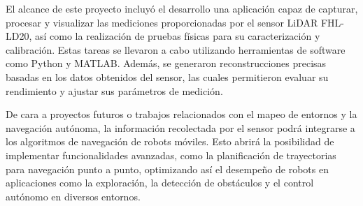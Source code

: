 El alcance de este proyecto incluyó el desarrollo una aplicación capaz de capturar, procesar y visualizar las mediciones proporcionadas por el sensor LiDAR FHL-LD20, así como la realización de pruebas físicas para su caracterización y calibración. Estas tareas se llevaron a cabo utilizando herramientas de software como Python y MATLAB. Además, se generaron reconstrucciones precisas basadas en los datos obtenidos del sensor, las cuales permitieron evaluar su rendimiento y ajustar sus parámetros de medición.
	
De cara a proyectos futuros o trabajos relacionados con el mapeo de entornos y la navegación autónoma, la información recolectada por el sensor podrá integrarse a los algoritmos de navegación de robots móviles. Esto abrirá la posibilidad de implementar funcionalidades avanzadas, como la planificación de trayectorias para navegación punto a punto, optimizando así el desempeño de robots en aplicaciones como la exploración, la detección de obstáculos y el control autónomo en diversos entornos.